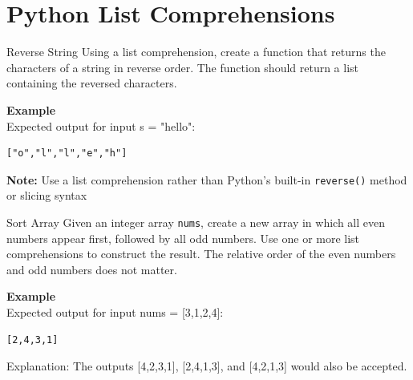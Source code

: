 \documentclass[twoside]{article}
\begin{document}
\newpage
\section{Python List Comprehensions}



\begin{task}{Reverse String}{}{}
Using a list comprehension, create a function that returns the characters of a string in reverse order.
The function should return a list containing the reversed characters.

\vspace{10pt}
\textbf{Example}\\
Expected output for input s = "hello":
\begin{lstlisting}[numbers=none]
["o","l","l","e","h"]
\end{lstlisting}

\textbf{Note:} Use a list comprehension rather than Python's built-in \texttt{reverse()} method or slicing syntax

\end{task}


\begin{task}{Sort Array}{}{}
Given an integer array \texttt{nums}, create a new array in which all even numbers appear first, followed by all odd numbers. 
Use one or more list comprehensions to construct the result. 
The relative order of the even numbers and odd numbers does not matter.

\vspace{10pt}
\textbf{Example}\\
Expected output for input nums = [3,1,2,4]:
\begin{lstlisting}[numbers=none]
[2,4,3,1]
\end{lstlisting}
Explanation: The outputs [4,2,3,1], [2,4,1,3], and [4,2,1,3] would also be accepted.

\end{task}
\end{document}
